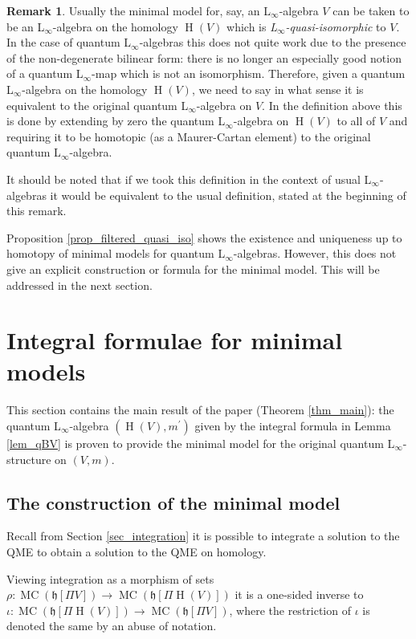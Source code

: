 \documentclass[]{amsart}
\theoremstyle{definition}
\newtheorem{remark}[theorem]{Remark}
\newcommand{\Linf}{L$_\infty$}
\newcommand{\MC}{\operatorname{MC}}
\newcommand{\homology}{\operatorname{H}}
\begin{document}
\begin{remark}
Usually the minimal model for, say, an \Linf-algebra $V$ can be taken to be an \Linf-algebra on the homology $\homology(V)$ which is \emph{\Linf-quasi-isomorphic} to $V$. In the case of quantum \Linf-algebras this does not quite work due to the presence of the non-degenerate bilinear form: there is no longer an especially good notion of a quantum \Linf-map which is not an isomorphism. Therefore, given a quantum \Linf-algebra on the homology $\homology(V)$, we need to say in what sense it is equivalent to the original quantum \Linf-algebra on $V$. In the definition above this is done by extending by zero the quantum \Linf-algebra on $\homology(V)$ to all of $V$ and requiring it to be homotopic (as a Maurer-Cartan element) to the original quantum \Linf-algebra.

It should be noted that if we took this definition in the context of usual \Linf-algebras it would be equivalent to the usual definition, stated at the beginning of this remark.
\end{remark}

Proposition \ref{prop_filtered_quasi_iso} shows the existence and uniqueness up to homotopy of minimal models for quantum \Linf-algebras. However, this does not give an explicit construction or formula for the minimal model. This will be addressed in the next section.

\section{Integral formulae for minimal models}\label{sec_minimal_models}

This section contains the main result of the paper (Theorem \ref{thm_main}): the quantum \Linf-algebra $(\homology (V),m^\prime )$ given by the integral formula in Lemma \ref{lem_qBV} is proven to provide the minimal model for the original quantum \Linf-structure on $(V,m)$.

\subsection{The construction of the minimal model}

Recall from Section \ref{sec_integration} it is possible to integrate a solution to the QME to obtain a solution to the QME on homology.

Viewing integration as a morphism of sets $\rho \colon \MC (\mathfrak{h}[\Pi V])\to\MC (\mathfrak{h}[\Pi \homology (V)])$ it is a one-sided inverse to $\iota\colon \MC (\mathfrak{h}[\Pi \homology (V)])\to\MC (\mathfrak{h}[\Pi V])$, where the restriction of $\iota$ is denoted the same by an abuse of notation.
\end{document}
